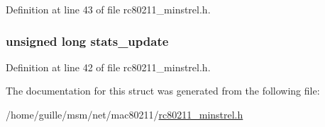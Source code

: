 Definition at line 43 of file rc80211\-\_\-minstrel.\-h.

\hypertarget{structminstrel__sta__info_a3c5301bb7fd4073bbad86d50eff8f188}{
\subsubsection[{stats\-\_\-update}]{\setlength{\rightskip}{0pt plus 5cm}unsigned long stats\-\_\-update}}\label{structminstrel__sta__info_a3c5301bb7fd4073bbad86d50eff8f188}


Definition at line 42 of file rc80211\-\_\-minstrel.\-h.



The documentation for this struct was generated from the following file\-:\begin{DoxyCompactItemize}
\item 
/home/guille/msm/net/mac80211/\hyperlink{rc80211__minstrel_8h}{rc80211\-\_\-minstrel.\-h}\end{DoxyCompactItemize}
